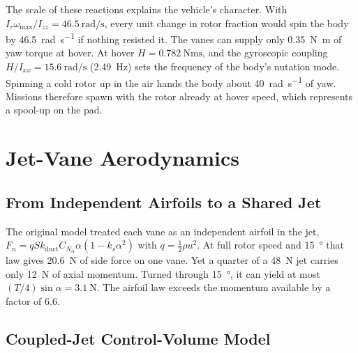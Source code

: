 \documentclass[journal]{IEEEtran}
\newcommand{\Ir}{I_r}
\newcommand{\wmax}{\omega_{\max}}
\begin{document}
The scale of these reactions explains the vehicle's character.
With $\Ir\wmax/I_{zz} = \SI{46.5}{\radian\per\second}$, every unit change in rotor fraction would spin the body by \SI{46.5}{\radian\per\second} if nothing resisted it.
The vanes can supply only \SI{0.35}{\newton\metre} of yaw torque at hover.
At hover $H = \SI{0.782}{\newton\metre\second}$, and the gyroscopic coupling $H/I_{xx} = \SI{15.6}{\radian\per\second}$ (\SI{2.49}{\hertz}) sets the frequency of the body's nutation mode.
Spinning a cold rotor up in the air hands the body about \SI{40}{\radian\per\second} of yaw.
Missions therefore spawn with the rotor already at hover speed, which represents a spool-up on the pad.

\section{Jet-Vane Aerodynamics}
\label{sec:vanes}

\subsection{From Independent Airfoils to a Shared Jet}

The original model treated each vane as an independent airfoil in the jet, $F_n = qSk_{\text{duct}}C_{N_\alpha}\alpha(1 - k_s\alpha^2)$ with $q = \tfrac12\rho u^2$.
At full rotor speed and \SI{15}{\degree} that law gives \SI{20.6}{\newton} of side force on one vane.
Yet a quarter of a \SI{48}{\newton} jet carries only \SI{12}{\newton} of axial momentum.
Turned through \SI{15}{\degree}, it can yield at most $(T/4)\sin\alpha = \SI{3.1}{\newton}$.
The airfoil law exceeds the momentum available by a factor of 6.6.

\subsection{Coupled-Jet Control-Volume Model}
\label{sec:coupledjet}
\end{document}
